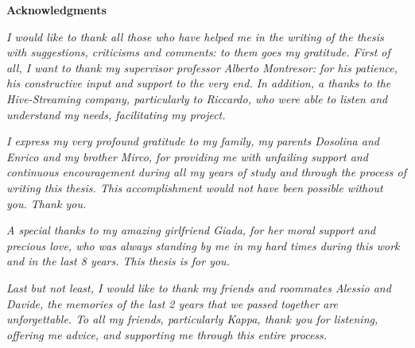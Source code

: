 \thispagestyle{empty}

\begin{center}
  {\bf \Huge Acknowledgments}
\end{center}

\vspace{4cm}


\emph{
  	I would like to thank all those who have helped me in the writing of the thesis with suggestions, criticisms and comments: to them goes my gratitude.
	First of all, I want to thank my supervisor professor Alberto Montresor: for his patience, his constructive input and support to the very end.
	In addition, a thanks to the Hive-Streaming company, particularly to Riccardo, who were able to listen and understand my needs, facilitating my project.
}

\emph{
	I express my very profound gratitude to my family, my parents Dosolina and Enrico and my brother Mirco, for providing me with unfailing support and continuous encouragement during all my years of study and through the process of writing this thesis. This accomplishment would not have been possible without you. Thank you.
}

\emph{
	A special thanks to my amazing girlfriend Giada, for her moral support and precious love, who was always standing by me in my hard times during this work and in the last 8 years. This thesis is for you.
}

\emph{
	Last but not least, I would like to thank my friends and roommates Alessio and Davide, the memories of the last 2 years that we passed together are unforgettable. To all my friends, particularly Kappa, thank you for listening, offering me advice, and supporting me through this entire process.
}
